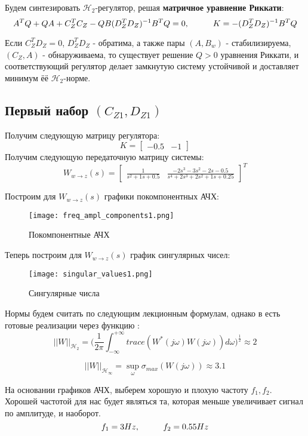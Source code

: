 Будем синтезировать $\mathcal{H}_2$-регулятор, решая \textbf{матричное уравнение Риккати}:
$$
    A^T Q + QA + C^T_Z C_Z - QB(D^T_Z D_Z)^{-1} B^T Q = 0, \hspace*{1cm} K = -(D^T_Z D_Z)^{-1} B^T Q
$$

Если $C_Z^T D_Z = 0$, $D^T_Z D_Z$ - обратима, а также пары $(A, B_w)$ - стабилизируема, 
$(C_Z, A)$ - обнаруживаема, то существует решение $Q > 0$ уравнения Риккати, и соответствующий регулятор
делает замкнутую систему устойчивой и доставляет минимум ёё $\mathcal{H}_2$-норме.



\newpage
\subsection{Первый набор $(C_{Z1},D_{Z1})$}

Получим следующую матрицу регулятора: 
$$
    K = \begin{bmatrix}
        -0.5 & -1 
    \end{bmatrix}
$$
Получим следующую передаточную матрицу системы:
$$
    W_{w\rightarrow z}(s) = \begin{bmatrix}\frac{1}{s^{2} + 1s + 0.5} & \frac{-2s^{3} - 3s^{2} - 2s - 0.5}{s^{4} + 2s^{3} + 2s^{2} + 1s + 0.25} \end{bmatrix}^T
$$

 


Построим для $W_{w\rightarrow z}(s)$ графики покомпонентных АЧХ:
\begin{figure}[ht]
    \centering
    \texttt{[image: freq\_ampl\_components1.png]}
    \caption{Покомпонентные АЧХ}
  \end{figure}
Теперь построим для $W_{w\rightarrow z}(s)$ график сингулярных чисел:
\begin{figure}[ht]
  \centering
  \texttt{[image: singular\_values1.png]}
  \caption{Сингулярные числа}
\end{figure}
Нормы будем считать по следующим лекционным формулам, однако в  
есть готовые реализации через функцию :
$$
    ||W||_{\mathcal{H}_2} = \bigg( \frac{1}{2\pi}\int_{-\infty}^{+\infty}trace(W^*(j\omega)W(j\omega))d\omega\bigg)^\frac{1}{2} \approx 2
$$

$$
    ||W||_{\mathcal{H}_\infty} = \sup_\omega \sigma_{max} (W(j\omega)) \approx 3.1
$$

На основании графиков АЧХ, выберем хорошую и плохую частоту $f_1, f_2$. 
Хорошей частотой для нас будет являться та, которая меньше увеличивает сигнал по амплитуде, и наоборот.
$$
    f_1 = 3 Hz, \hspace*{1cm} f_2 = 0.55 Hz
$$

